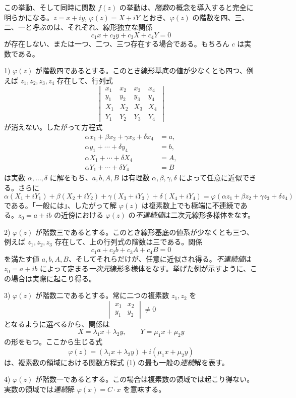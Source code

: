 この挙動、そして同時に関数 $f(z)$ の挙動は、\emph{階数}の概念を導入すると完全に明らかになる。$z=x+iy$, $\varphi(z)=X+iY$ とおき、$\varphi(z)$ の階数を四、三、二、一と呼ぶのは、それぞれ、線形独立な関係
\[
c_1x+c_2y+c_3X+c_4Y=0
\]
が存在しない、または一つ、二つ、三つ存在する場合である。もちろん $c$ は実数である。

1) $\varphi(z)$ が階数四であるとする。このとき線形基底の値が少なくとも四つ、例えば $z_1,z_2,z_3,z_4$ 存在して、行列式
\[
\begin{vmatrix}
x_1&x_2&x_3&x_4\\
y_1&y_2&y_3&y_4\\
X_1&X_2&X_3&X_4\\
Y_1&Y_2&Y_3&Y_4
\end{vmatrix}
\]
が消えない。したがって方程式
\[
\begin{aligned}
\alpha x_1+\beta x_2+\gamma x_3+\delta x_4&=a,\\
\alpha y_1+\cdots+\delta y_4&=b,\\
\alpha X_1+\cdots+\delta X_4&=A,\\
\alpha Y_1+\cdots+\delta Y_4&=B
\end{aligned}
\]
は実数 $\alpha,\ldots,\delta$ に解をもち、$a,b,A,B$ は有理数 $\alpha,\beta,\gamma,\delta$ によって任意に近似できる。さらに
\[
\alpha(X_1+iY_1)+\beta(X_2+iY_2)+\gamma(X_3+iY_3)+\delta(X_4+iY_4)
=\varphi(\alpha z_1+\beta z_2+\gamma z_3+\delta z_4)
\]
である。「一般には」、したがって解 $\varphi(z)$ は複素数上でも極端に不連続である。$z_0=a+ib$ の近傍における $\varphi(z)$ の\emph{不連続値}は二次元線形多様体をなす。

2) $\varphi(z)$ が階数三であるとする。このとき線形基底の値系が少なくとも三つ、例えば $z_1,z_2,z_3$ 存在して、上の行列式の階数は三である。関係
\[
c_1a+c_2b+c_3A+c_4B=0
\]
を満たす値 $a,b,A,B$、そしてそれらだけが、任意に近似され得る。\emph{不連続値}は $z_0=a+ib$ によって定まる\emph{一次元}線形多様体をなす。挙げた例が示すように、この場合は実際に起こり得る。

3) $\varphi(z)$ が階数二であるとする。常に二つの複素数 $z_1,z_2$ を
\[
\begin{vmatrix}x_1&x_2\\ y_1&y_2\end{vmatrix}\ne0
\]
となるように選べるから、関係は
\[
X=\lambda_1x+\lambda_2y,
\qquad
Y=\mu_1x+\mu_2y
\]
の形をもつ。ここから生じる式
\[
\varphi(z)=(\lambda_1x+\lambda_2y)+i(\mu_1x+\mu_2y)
\]
は、複素数の領域における関数方程式 (1) の最も一般の\emph{連続}解を表す。

4) $\varphi(z)$ が階数一であるとする。この場合は複素数の領域では起こり得ない。実数の領域では\emph{連続}解 $\varphi(x)=C\cdot x$ を意味する。

